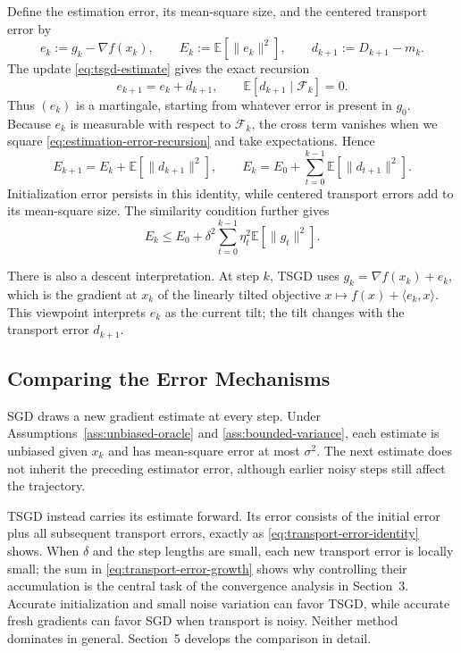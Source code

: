 Define the estimation error, its mean-square size, and the centered
transport error by
\[
e_k:=g_k-\nabla f(x_k),\qquad
E_k:=\mathbb{E}[\|e_k\|^2],\qquad
d_{k+1}:=D_{k+1}-m_k.
\]
The update \eqref{eq:tsgd-estimate} gives the exact recursion
\begin{equation}
\label{eq:estimation-error-recursion}
e_{k+1}=e_k+d_{k+1},
\qquad
\mathbb{E}[d_{k+1}\mid\mathcal F_k]=0.
\end{equation}
Thus $(e_k)$ is a martingale, starting from whatever error is present in
$g_0$. Because $e_k$ is measurable with respect to $\mathcal F_k$, the cross
term vanishes when we square \eqref{eq:estimation-error-recursion} and take
expectations. Hence
\begin{equation}
\label{eq:transport-error-identity}
E_{k+1}=E_k+\mathbb{E}[\|d_{k+1}\|^2],
\qquad
E_k=E_0+\sum_{t=0}^{k-1}\mathbb{E}[\|d_{t+1}\|^2].
\end{equation}
Initialization error persists in this identity, while centered transport
errors add to its mean-square size. The similarity condition further gives
\begin{equation}
\label{eq:transport-error-growth}
E_k\leq E_0+\delta^2\sum_{t=0}^{k-1}
  \eta_t^2\mathbb{E}[\|g_t\|^2].
\end{equation}

There is also a descent interpretation. At step $k$, TSGD uses
$g_k=\nabla f(x_k)+e_k$, which is the gradient at $x_k$ of the linearly
tilted objective $x\mapsto f(x)+\langle e_k,x\rangle$. This viewpoint
interprets $e_k$ as the current tilt; the tilt changes with the
transport error $d_{k+1}$.

\subsection{Comparing the Error Mechanisms}
\label{subsec:comparing-error-mechanisms}

SGD draws a new gradient estimate at every step. Under
Assumptions~\ref{ass:unbiased-oracle} and \ref{ass:bounded-variance},
each estimate is unbiased given $x_k$ and has mean-square error at most
$\sigma^2$. The next estimate does not inherit the preceding estimator
error, although earlier noisy steps still affect the trajectory.

TSGD instead carries its estimate forward. Its error consists of the
initial error plus all subsequent transport errors, exactly as
\eqref{eq:transport-error-identity} shows. When $\delta$ and the step
lengths are small, each new transport error is locally small; the sum in
\eqref{eq:transport-error-growth} shows why controlling their accumulation
is the central task of the convergence analysis in Section~3. Accurate
initialization and small noise variation can favor TSGD, while accurate
fresh gradients can favor SGD when transport is noisy. Neither method
dominates in general. Section~5 develops the comparison in detail.
